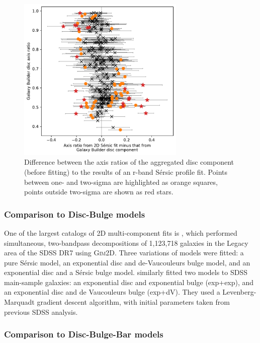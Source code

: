\documentclass[../main.tex]{subfiles}
\begin{document}
\begin{figure}
  \includegraphics[width=8cm]{images__results/gzb-agg-nsa-comparison.pdf}
  \caption{Difference between the axis ratios of the aggregated disc component (before fitting) to the results of an r-band S\'ersic profile fit. Points  between one- and two-sigma are highlighted as orange squares, points outside two-sigma are shown as red stars.}
  \label{fig:ax_ratio_comparison}
\end{figure}


\subsubsection{Comparison to Disc-Bulge models}


One of the largest catalogs of 2D multi-component fits is \citet{2011ApJS..196...11S}, which performed simultaneous, two-bandpass decompositions of 1,123,718 galaxies in the Legacy area of the SDSS DR7 using \textsc{Gim2D}. Three variations of models were fitted: a pure S\'ersic model, an exponential disc and de-Vaucouleurs bulge model, and an exponential disc and a S\'ersic bulge model. \citet{2012MNRAS.421.2277L} similarly fitted two models to SDSS main-sample galaxies: an exponential disc and exponential bulge (exp+exp), and an exponential disc and de Vaucouleurs bulge (exp+dV). They used a Levenberg-Marquadt gradient descent algorithm, with initial parameters taken from previous SDSS analysis.


\subsubsection{Comparison to Disc-Bulge-Bar models}
\end{document}
